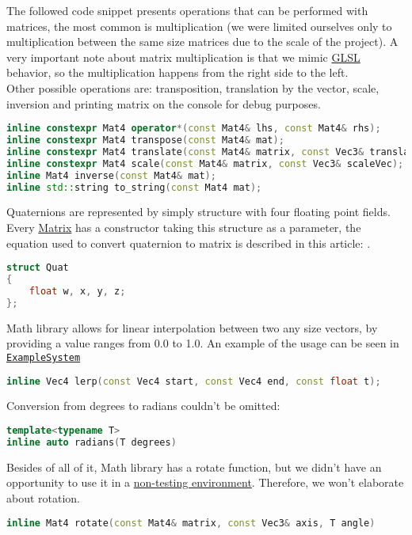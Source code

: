 The followed code snippet presents operations that can be performed with matrices, the most common is multiplication (we were limited ourselves only to multiplication between the same size matrices due to the scale of the project). A very important note about matrix multiplication is that we mimic \hyperref[sec:glsl]{GLSL} behavior, so the multiplication happens from the right side to the left.\\Other possible operations are: transposition, translation by the vector, scale, inversion and printing matrix on the console for debug purposes.
\begin{lstlisting}[language=c++, caption=Matrix operations(./engine/include/tsengine/math.hpp)]
inline constexpr Mat4 operator*(const Mat4& lhs, const Mat4& rhs);
inline constexpr Mat4 transpose(const Mat4& mat);
inline constexpr Mat4 translate(const Mat4& matrix, const Vec3& translation);
inline constexpr Mat4 scale(const Mat4& matrix, const Vec3& scaleVec);
inline Mat4 inverse(const Mat4& mat);
inline std::string to_string(const Mat4 mat);
\end{lstlisting}
Quaternions are represented by simply structure with four floating point fields. Every \hyperref[sec:mat]{Matrix} has a constructor taking this structure as a parameter, the equation used to convert quaternion to matrix is described in this article: \cite{quatToMat}.
\begin{lstlisting}[language=c++, caption=Quaternion class(./engine/include/tsengine/math.hpp)]
struct Quat
{
    float w, x, y, z;
};
\end{lstlisting}
Math library allows for linear interpolation between two any size vectors, by providing a value ranges from 0.0 to 1.0.
An example of the usage can be seen in \hyperref[sec:example_system]{\texttt{ExampleSystem}}
\begin{lstlisting}[language=c++, caption=Linear interpolation of Vector(./engine/include/tsengine/math.hpp)]
inline Vec4 lerp(const Vec4 start, const Vec4 end, const float t);
\end{lstlisting}
Conversion from degrees to radians couldn't be omitted:
\begin{lstlisting}[language=c++, caption=Radians conversion(./engine/include/tsengine/math.hpp)]
template<typename T>
inline auto radians(T degrees)
\end{lstlisting}
Besides of all of it, Math library has a rotate function, but we didn't have an opportunity to use it in a \hyperref[sec:rotation_test]{non-testing environment}. Therefore, we won't elaborate about rotation.
\begin{lstlisting}[language=c++, caption=Rotation function(./engine/include/tsengine/math.hpp)]
inline Mat4 rotate(const Mat4& matrix, const Vec3& axis, T angle)
\end{lstlisting}
